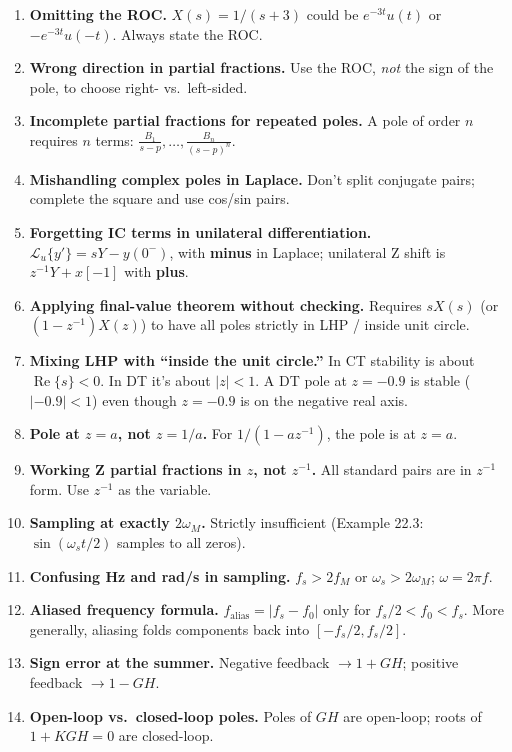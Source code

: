 \documentclass{article}
\begin{document}
\begin{enumerate}
  \item \textbf{Omitting the ROC.} $X(s)=1/(s+3)$ could be $e^{-3t}u(t)$ or $-e^{-3t}u(-t)$. Always state the ROC.
  \item \textbf{Wrong direction in partial fractions.} Use the ROC, \emph{not} the sign of the pole, to choose right- vs.\ left-sided.
  \item \textbf{Incomplete partial fractions for repeated poles.} A pole of order $n$ requires $n$ terms: $\frac{B_1}{s-p},\ldots,\frac{B_n}{(s-p)^n}$.
  \item \textbf{Mishandling complex poles in Laplace.} Don't split conjugate pairs; complete the square and use cos/sin pairs.
  \item \textbf{Forgetting IC terms in unilateral differentiation.} $\mathcal{L}_u\{y'\} = sY - y(0^-)$, with \textbf{minus} in Laplace; unilateral Z shift is $z^{-1}Y + x[-1]$ with \textbf{plus}.
  \item \textbf{Applying final-value theorem without checking.} Requires $sX(s)$ (or $(1-z^{-1})X(z)$) to have all poles strictly in LHP / inside unit circle.
  \item \textbf{Mixing LHP with ``inside the unit circle.''} In CT stability is about $\operatorname{Re}\{s\}<0$. In DT it's about $|z|<1$. A DT pole at $z=-0.9$ is stable ($|-0.9|<1$) even though $z=-0.9$ is on the negative real axis.
  \item \textbf{Pole at $z=a$, not $z=1/a$.} For $1/(1-az^{-1})$, the pole is at $z=a$.
  \item \textbf{Working Z partial fractions in $z$, not $z^{-1}$.} All standard pairs are in $z^{-1}$ form. Use $z^{-1}$ as the variable.
  \item \textbf{Sampling at exactly $2\omega_M$.} Strictly insufficient (Example 22.3: $\sin(\omega_s t/2)$ samples to all zeros).
  \item \textbf{Confusing Hz and rad/s in sampling.} $f_s > 2f_M$ or $\omega_s > 2\omega_M$; $\omega = 2\pi f$.
  \item \textbf{Aliased frequency formula.} $f_\text{alias} = |f_s - f_0|$ only for $f_s/2 < f_0 < f_s$. More generally, aliasing folds components back into $[-f_s/2, f_s/2]$.
  \item \textbf{Sign error at the summer.} Negative feedback $\to 1+GH$; positive feedback $\to 1-GH$.
  \item \textbf{Open-loop vs.\ closed-loop poles.} Poles of $GH$ are open-loop; roots of $1+KGH=0$ are closed-loop.

\end{enumerate}
\end{document}
